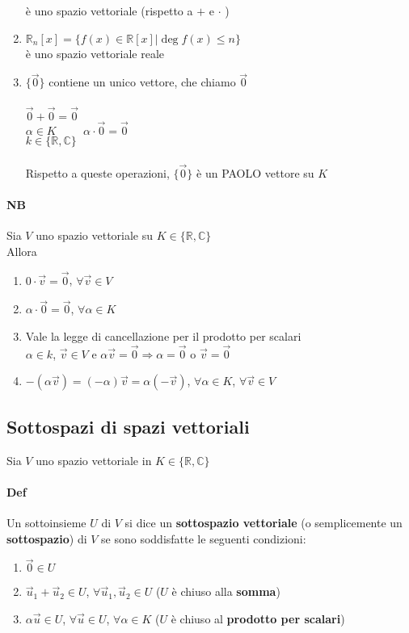 \begin{enumerate}
        è uno spazio vettoriale (rispetto a $+$ e $\cdot$ ) \\
    \item $\mathbb{R}_n[x]=\{f(x)\in\mathbb{R}[x]|\deg f(x)\leq n\}$\\
        è uno spazio vettoriale reale
    \item $\{\vec{0}\}$ contiene un unico vettore, che chiamo $\vec{0}$\\\\
        $\vec{0} + \vec{0} = \vec{0}$\\
        $\alpha \in K \hspace{1cm} \alpha\cdot\vec{0} = \vec{0}$\\
        $k\in\{\mathbb{R}, \mathbb{C}\}$\\\\
        Rispetto a queste operazioni, $\{\vec{0}\}$ è un {\color{purple} PAOLO} vettore su $K$
\end{enumerate}
\paragraph{NB}
Sia $V$ uno spazio vettoriale su $K\in\{\mathbb{R},\mathbb{C}\}$\\ Allora
\begin{enumerate}
    \item $0 \cdot \vec{v} = \vec{0}$, $\forall \vec{v}\in V$
    \item $\alpha \cdot \vec{0} = \vec{0}$, $\forall \alpha\in K$
    \item {\color{red} Vale la legge di cancellazione per il prodotto per scalari}\\
        $\alpha\in k$, $\vec{v}\in V$ e $\alpha\vec{v}=\vec{0}
        \Longrightarrow \alpha = \vec{0}$ o $\vec{v}=\vec{0}$
    \item $-(\alpha\vec{v})=(-\alpha)\vec{v}=\alpha(-\vec{v})$, 
        $\forall \alpha\in K$, $\forall\vec{v}\in V$

\end{enumerate}


\subsection{Sottospazi di spazi vettoriali}
Sia $V$ uno spazio vettoriale in $K\in\{\mathbb{R}, \mathbb{C}\}$
\paragraph{Def} Un sottoinsieme $U$ di $V$ si dice un \textbf{sottospazio vettoriale}
(o semplicemente 
un \textbf{sottospazio}) di $V$ se sono soddisfatte le seguenti condizioni:
\begin{enumerate}
    \item $\vec{0}\in U$
    \item $\vec{u}_1+\vec{u}_2\in U$, $\forall \vec{u}_1,\vec{u}_2\in U$ 
        ($U$ è chiuso alla \textbf{somma})
    \item $\alpha\vec{u}\in U$, $\forall\vec{u}\in U$, $\forall\alpha\in K$ 
        ($U$ è chiuso al \textbf{prodotto per scalari})
\end{enumerate}
